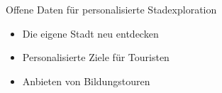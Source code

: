 \documentclass[13pt, usenames, dvipsnames]{beamer}
\begin{document}
\begin{frame}{Offene Daten für personalisierte Stadexploration}
    \begin{minipage}{.5\textwidth}
    \end{minipage}%
    \begin{minipage}{.5\textwidth}
        \begin{itemize}
            \item Die eigene Stadt neu entdecken
                \pause
            \item Personalisierte Ziele für Touristen
                \pause
            \item Anbieten von Bildungstouren
        \end{itemize}
    \end{minipage}
\end{frame}
\end{document}
